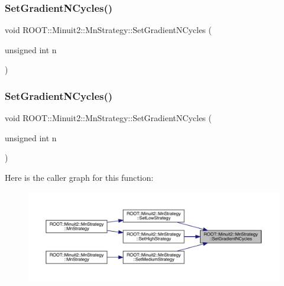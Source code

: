 \subsubsection{\texorpdfstring{SetGradientNCycles()}{SetGradientNCycles()}\hspace{0.1cm}{\footnotesize\ttfamily [1/2]}}
{\footnotesize\ttfamily void R\+O\+O\+T\+::\+Minuit2\+::\+Mn\+Strategy\+::\+Set\+Gradient\+N\+Cycles (\begin{DoxyParamCaption}\item[{unsigned int}]{n }\end{DoxyParamCaption})\hspace{0.3cm}{\ttfamily [inline]}}

\mbox{\label{classROOT_1_1Minuit2_1_1MnStrategy_abf74d8c002c658339f15df4b56aa4fdb}} 
\subsubsection{\texorpdfstring{SetGradientNCycles()}{SetGradientNCycles()}\hspace{0.1cm}{\footnotesize\ttfamily [2/2]}}
{\footnotesize\ttfamily void R\+O\+O\+T\+::\+Minuit2\+::\+Mn\+Strategy\+::\+Set\+Gradient\+N\+Cycles (\begin{DoxyParamCaption}\item[{unsigned int}]{n }\end{DoxyParamCaption})\hspace{0.3cm}{\ttfamily [inline]}}

Here is the caller graph for this function\+:\nopagebreak
\begin{figure}[H]
\begin{center}
\leavevmode
\includegraphics[width=350pt]{da/de4/classROOT_1_1Minuit2_1_1MnStrategy_abf74d8c002c658339f15df4b56aa4fdb_icgraph}
\end{center}
\end{figure}
\mbox{\label{classROOT_1_1Minuit2_1_1MnStrategy_ad6051100db67df070103c2478740ee8f}} 
